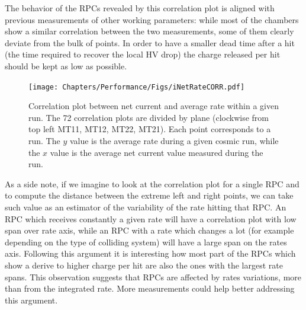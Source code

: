 The behavior of the RPCs revealed by this correlation plot is aligned with previous measurements of other working parameters: while most of the chambers show a similar correlation between the two measurements, some of them clearly deviate from the bulk of points.
In order to have a smaller dead time after a hit (the time required to recover the local HV drop) the charge released per hit should be kept as low as possible.

\begin{figure}[!t]
\begin{center}
\texttt{[image: Chapters/Performance/Figs/iNetRateCORR.pdf]}
\caption{Correlation plot between net current and average rate within a given run. The 72 correlation plots are divided by plane (clockwise from top left MT11, MT12, MT22, MT21). Each point corresponds to a run. The $y$ value is the average rate during a given cosmic run, while the $x$ value is the average net current value measured during the run.}
\label{fig:iNetvsRate4Planes}
\end{center}
\end{figure}

As a side note, if we imagine to look at the correlation plot for a single RPC and to compute the distance between the extreme left and right points, we can take such value as an estimator of the variability of the rate hitting that RPC.
An RPC which receives constantly a given rate will have a correlation plot with low span over rate axis, while an RPC with a rate which changes a lot (for example depending on the type of colliding system) will have a large span on the rates axis.
Following this argument it is interesting how most part of the RPCs which show a derive to higher charge per hit are also the ones with the largest rate spans.
This observation suggests that RPCs are affected by rates variations, more than from the integrated rate.
More measurements could help better addressing this argument.


